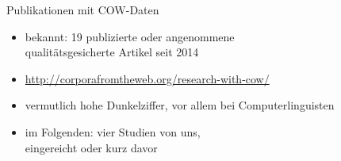 \begin{frame}
  {Publikationen mit COW-Daten}
  \begin{itemize}
    \item bekannt: 19 publizierte oder angenommene\\qualitätsgesicherte Artikel seit 2014 
    \item \url{http://corporafromtheweb.org/research-with-cow/}
    \item vermutlich hohe Dunkelziffer, vor allem bei Computerlinguisten
    \item im Folgenden: vier Studien von uns,\\eingereicht oder kurz davor 
  \end{itemize}
\end{frame}

